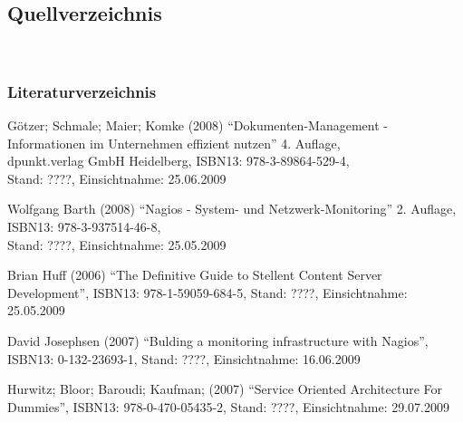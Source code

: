 \documentclass[12pt, a4paper, headsepline]{article}
\begin{document}
\subsection{Quellverzeichnis}

\\

\subsubsection{Literaturverzeichnis}

\begin{thebibliography}{xxxxxxxx}
	 Götzer; Schmale; Maier; Komke (2008) "`Dokumenten-Management - Informationen im Unternehmen effizient nutzen"' 4. Auflage,\\
	 dpunkt.verlag GmbH Heidelberg,  
	 ISBN13: 978-3-89864-529-4,\\
	 Stand: ????, Einsichtnahme: 25.06.2009

	 Wolfgang Barth (2008) "`Nagios - System- und Netzwerk-Monitoring"' 2. Auflage, \\
	 ISBN13: 978-3-937514-46-8, \\
	 Stand: ????, Einsichtnahme: 25.05.2009
	 
	 Brian Huff (2006) "`The Definitive Guide to Stellent Content Server Development"', \newline ISBN13: 978-1-59059-684-5, \newline Stand: ????, Einsichtnahme: 25.05.2009

	 David Josephsen (2007) "`Bulding a monitoring infrastructure with Nagios"', \newline ISBN13: 0-132-23693-1, \newline Stand: ????, Einsichtnahme: 16.06.2009

	 Hurwitz; Bloor; Baroudi; Kaufman; (2007) "`Service Oriented Architecture For Dummies"', \newline ISBN13: 978-0-470-05435-2, \newline Stand: ????, Einsichtnahme: 29.07.2009
		 
		 
	 	
\end{thebibliography}
\newpage
\end{document}
